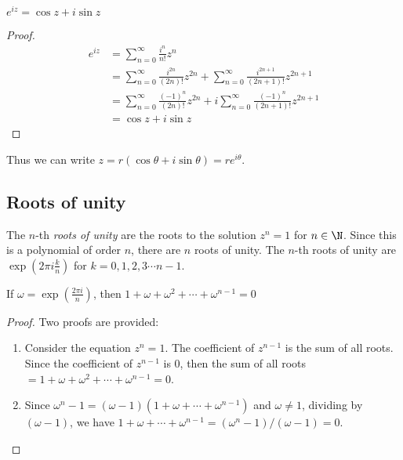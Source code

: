 \documentclass[a4paper]{article}
\begin{document}
\begin{thm}
  $e^{iz} = \cos z + i\sin z$
\end{thm}

\begin{proof}
  \begin{align*}
    e^{iz} &= \sum_{n=0}^\infty \frac{i^n}{n!}z^n\\
    &= \sum_{n=0}^\infty \frac{i^{2n}}{(2n)!}z^{2n} + \sum_{n=0}^\infty \frac{i^{2n+1}}{(2n+1)!}z^{2n+1}\\
    &= \sum_{n=0}^\infty \frac{(-1)^n}{(2n)!}z^{2n} + i \sum_{n=0}^\infty \frac{(-1)^n}{(2n+1)!}z^{2n+1}\\
    &= \cos z + i\sin z
  \end{align*}
\end{proof}
Thus we can write $z = r(\cos\theta + i\sin\theta) = re^{i\theta}$.

\subsection{Roots of unity}
\begin{defi}
  The $n$-th \emph{roots of unity} are the roots to the solution $z^n = 1$ for $n\in \N$. Since this is a polynomial of order $n$, there are $n$ roots of unity. The $n$-th roots of unity are $\exp\left(2\pi i\frac{k}{n}\right)$ for $k = 0, 1, 2, 3\cdots n - 1$.
\end{defi}

\begin{prop}
  If $\omega = \exp\left(\frac{2\pi i}{n}\right)$, then $1 + \omega + \omega^2 + \cdots + \omega^{n - 1} = 0$
\end{prop}

\begin{proof}
  Two proofs are provided:
  \begin{enumerate}
    \item Consider the equation $z^n = 1$. The coefficient of $z^{n-1}$ is the sum of all roots. Since the coefficient of $z^{n-1}$ is 0, then the sum of all roots $= 1 + \omega + \omega^2 + \cdots + \omega^{n-1} = 0$.
    \item Since $\omega^n - 1 = (\omega - 1)(1 + \omega + \cdots + \omega^{n - 1})$ and $\omega \not= 1$, dividing by $(\omega - 1)$, we have $1 + \omega + \cdots + \omega^{n-1} = (\omega^n - 1)/(\omega - 1) = 0$.
  \end{enumerate}
\end{proof}
\end{document}
